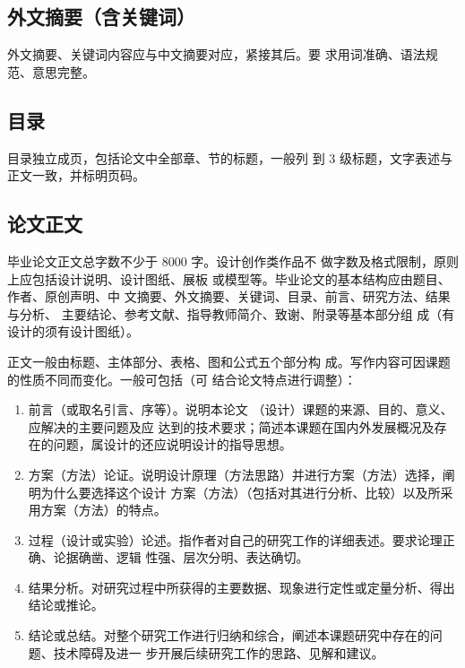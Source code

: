 \documentclass{swfuthesis}
\begin{document}
\subsection{外文摘要（含关键词）}

外文摘要、关键词内容应与中文摘要对应，紧接其后。要
求用词准确、语法规范、意思完整。

\subsection{目录}

目录独立成页，包括论文中全部章、节的标题，一般列
到 3 级标题，文字表述与正文一致，并标明页码。

\subsection{论文正文}

毕业论文正文总字数不少于 8000 字。设计创作类作品不
做字数及格式限制，原则上应包括设计说明、设计图纸、展板
或模型等。毕业论文的基本结构应由题目、作者、原创声明、中
文摘要、外文摘要、关键词、目录、前言、研究方法、结果与分析、
主要结论、参考文献、指导教师简介、致谢、附录等基本部分组
成（有设计的须有设计图纸）。

正文一般由标题、主体部分、表格、图和公式五个部分构
成。写作内容可因课题的性质不同而变化。一般可包括（可
结合论文特点进行调整）：
\begin{enumerate}
\item 前言（或取名引言、序等）。说明本论文 （设计）课题的来源、目的、意义、应解决的主要问题及应
  达到的技术要求；简述本课题在国内外发展概况及存在的问题，属设计的还应说明设计的指导思想。
\item 方案（方法）论证。说明设计原理（方法思路）并进行方案（方法）选择，阐明为什么要选择这个设计
  方案（方法）（包括对其进行分析、比较）以及所采用方案（方法）的特点。
\item 过程（设计或实验）论述。指作者对自己的研究工作的详细表述。要求论理正确、论据确凿、逻辑
  性强、层次分明、表达确切。
\item 结果分析。对研究过程中所获得的主要数据、现象进行定性或定量分析、得出结论或推论。
\item 结论或总结。对整个研究工作进行归纳和综合，阐述本课题研究中存在的问题、技术障碍及进一
  步开展后续研究工作的思路、见解和建议。
\end{enumerate}
\end{document}
